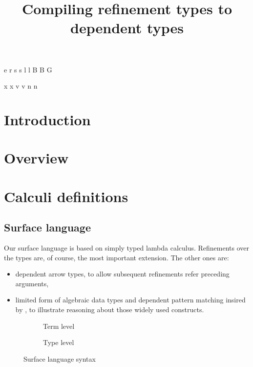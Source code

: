 \documentclass[a4paper]{article}
\begin{document}
\newnonterm e \varepsilon
{}
\newnonterm r \rho
{}
\newnonterm s s
\newnonterm l l
\newnonterm B B
\newnonterm G \Gamma
{}

\newgterm x x
\newgterm v v
\newgterm n n


\title{Compiling refinement types to dependent types}

\maketitle

\section{Introduction}

\section{Overview}


\section{Calculi definitions}

\subsection{Surface language}

Our surface language is based on simply typed lambda calculus.
Refinements over the types are, of course, the most important extension.
The other ones are:
\begin{itemize}
  \item dependent arrow types, to allow subsequent refinements refer preceding arguments,
  \item limited form of algebraic data types and dependent pattern matching
    insired by \cite{TAPLVariants,Eisenberg16},
    to illustrate reasoning about those widely used constructs.
\end{itemize}

\begin{figure}[ht]
  \footnotesize
  \begin{subfigure}{.6\textwidth}
    \caption{Term level}
  \end{subfigure}
  \begin{subfigure}{.5\textwidth}
    \caption{Type level}
  \end{subfigure}
  \caption{Surface language syntax}
  \label{fig:surface_syntax}
\end{figure}
\end{document}
